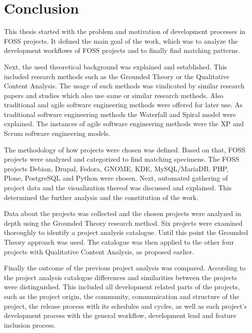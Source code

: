 \chapter{Conclusion} %
\label{chap:conclusion}

This thesis started with the problem and motivation of development processes in
\ac{FOSS} projects. It defined the main goal of the work, which was to analyze
the development workflows of \ac{FOSS} projects and to finally find matching
patterns.

Next, the used theoretical background was explained and established. This
included research methods such as the Grounded Theory or the Qualitative
Content Analysis. The usage of such methods was vindicated by similar research
papers and studies which also use same or similar research methods. Also
traditional and agile software engineering methods were offered for later use.
As traditional software engineering methods the Waterfall and Spiral model were
explained. The instances of agile software engineering methods were the
\acl{XP} and Scrum software engineering models.

The methodology of how projects were chosen was defined. Based on that,
\ac{FOSS} projects were analyzed and categorized to find matching specimens.
The \ac{FOSS} projects Debian, Drupal, Fedora, GNOME, KDE, MySQL/MariaDB, PHP,
Plone, PostgreSQL and Python were chosen. Next, automated gathering of project
data and the visualization thereof was discussed and explained. This determined
the further analysis and the constitution of the work.

Data about the projects was collected and the chosen projects were analyzed in
depth using the Grounded Theory research method. Six projects were examined
thoroughly to identify a project analysis catalogue. Until this point the
Grounded Theory approach was used. The catalogue was then applied to the other
four projects with Qualitative Content Analysis, as proposed earlier.

Finally the outcome of the previous project analysis was compared. According to
the project analysis catalogue differences and similarities between the
projects were distinguished. This included all development related parts of the
projects, such as the project origin, the community, communication and
structure of the project, the release process with its schedules and cycles, as
well as each project's development process with the general workflow,
development lead and feature inclusion process.

